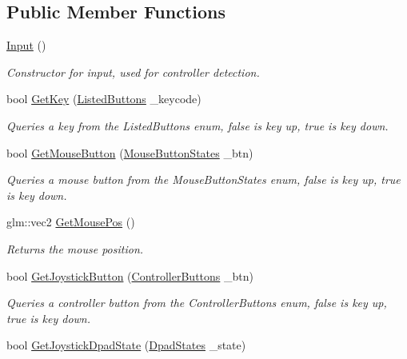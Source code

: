\subsection*{Public Member Functions}
\begin{DoxyCompactItemize}
\item 
\hyperlink{classfrontier_1_1_input_a42044ec5fabe49b52de3437eac14dab0}{Input} ()
\begin{DoxyCompactList}\small\item\em Constructor for input, used for controller detection. \end{DoxyCompactList}\item 
bool \hyperlink{classfrontier_1_1_input_a010a90cb5ee5fe7c13e5e5fa74728bfa}{Get\+Key} (\hyperlink{classfrontier_1_1_input_ada5b6b09af9c827bacee6fbc69015096}{Listed\+Buttons} \+\_\+keycode)
\begin{DoxyCompactList}\small\item\em Queries a key from the Listed\+Buttons enum, false is key up, true is key down. \end{DoxyCompactList}\item 
bool \hyperlink{classfrontier_1_1_input_ab7b944042e2bf83992b8347ea89a08c6}{Get\+Mouse\+Button} (\hyperlink{classfrontier_1_1_input_ae78744e8c0799230bc6533be5d4b40f7}{Mouse\+Button\+States} \+\_\+btn)
\begin{DoxyCompactList}\small\item\em Queries a mouse button from the Mouse\+Button\+States enum, false is key up, true is key down. \end{DoxyCompactList}\item 
glm\+::vec2 \hyperlink{classfrontier_1_1_input_a56ffa5acb487fd1e1b7afe45760606cd}{Get\+Mouse\+Pos} ()
\begin{DoxyCompactList}\small\item\em Returns the mouse position. \end{DoxyCompactList}\item 
bool \hyperlink{classfrontier_1_1_input_a1e208f9684151e5d11dcf3376e4b99a3}{Get\+Joystick\+Button} (\hyperlink{classfrontier_1_1_input_affa0331a173268233d6630184a105bb6}{Controller\+Buttons} \+\_\+btn)
\begin{DoxyCompactList}\small\item\em Queries a controller button from the Controller\+Buttons enum, false is key up, true is key down. \end{DoxyCompactList}\item 
bool \hyperlink{classfrontier_1_1_input_a48d6f21151c9cc7ed93b386d0be25bf0}{Get\+Joystick\+Dpad\+State} (\hyperlink{classfrontier_1_1_input_a53a85fe24f5b35e1a42ab370dcd0d94e}{Dpad\+States} \+\_\+state)

\end{DoxyCompactItemize}
